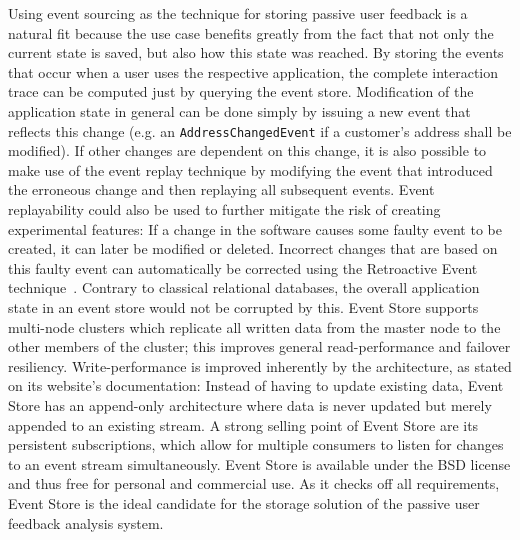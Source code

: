 Using event sourcing as the technique for storing passive user feedback is a natural fit because the use case benefits greatly from the fact that not only the current state is saved, but also how this state was reached.
By storing the events that occur when a user uses the respective application, the complete interaction trace can be computed just by querying the event store.
Modification of the application state in general can be done simply by issuing a new event that reflects this change (e.g. an \texttt{AddressChangedEvent} if a customer's address shall be modified).
If other changes are dependent on this change, it is also possible to make use of the event replay technique by modifying the event that introduced the erroneous change and then replaying all subsequent events.
Event replayability could also be used to further mitigate the risk of creating experimental features: If a change in the software causes some faulty event to be created, it can later be modified or deleted.
Incorrect changes that are based on this faulty event can automatically be corrected using the Retroactive Event technique~\cite{WEB:Fowler:2005-3}.
Contrary to classical relational databases, the overall application state in an event store would not be corrupted by this.
Event Store supports multi-node clusters which replicate all written data from the master node to the other members of the cluster; this improves general read-performance and failover resiliency.
Write-performance is improved inherently by the architecture, as stated on its website's documentation:
Instead of having to update existing data, Event Store has an append-only architecture where data is never updated but merely appended to an existing stream.
A strong selling point of Event Store are its persistent subscriptions, which allow for multiple consumers to listen for changes to an event stream simultaneously.
Event Store is available under the BSD license and thus free for personal and commercial use.
As it checks off all requirements, Event Store is the ideal candidate for the storage solution of the passive user feedback analysis system.

